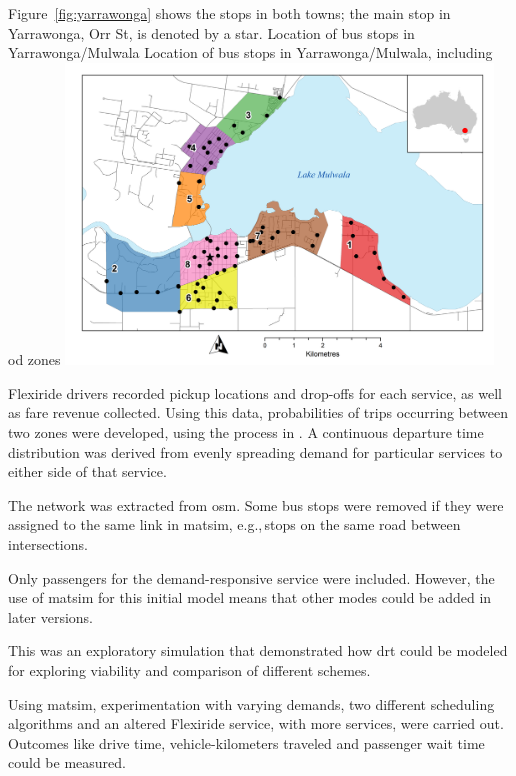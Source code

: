 Figure~\ref{fig:yarrawonga} shows the stops in both towns; the main stop in Yarrawonga, Orr St, is denoted by a star.
%
\createfigure%
{Location of bus stops in Yarrawonga/Mulwala}%
{Location of bus stops in Yarrawonga/Mulwala, including \gls{od} zones}%
{\label{fig:yarrawonga}}%
{\includegraphics[width=0.85\textwidth, angle=0]{./using/figures/yarrawonga_high.png}}%
{}
%

Flexiride drivers recorded pickup locations and drop-offs for each service,
as well as fare revenue collected. Using this data, probabilities of trips
occurring between two zones were developed, using the process in
\citet[][]{Deflorio_ITSIET_2011}. A continuous departure time distribution was
derived from evenly spreading demand for particular services to either side
of that service. 


The network was extracted from \gls{osm}. Some bus stops were removed if they were assigned to the same link in \gls{matsim}, e.g.,\,stops on the same road between intersections.

Only passengers for the demand-responsive service were included. However, the use of \gls{matsim} for this initial model means that other modes could be added in later versions.


This was an exploratory simulation that demonstrated how \gls{drt} could be modeled for exploring viability and comparison of different schemes.

Using \gls{matsim}, experimentation with varying demands, two different scheduling
algorithms and an altered Flexiride service, with more services, were
carried out. Outcomes like drive time, vehicle-kilometers traveled and
passenger wait time could be measured.


